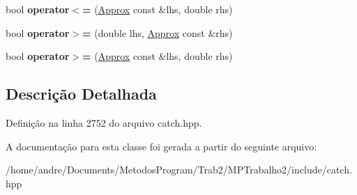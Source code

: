 \begin{DoxyCompactItemize}
\item 
bool {\bfseries operator$<$=} (\hyperlink{classCatch_1_1Detail_1_1Approx}{Approx} const \&lhs, double rhs)\hypertarget{classCatch_1_1Detail_1_1Approx_a75c9382b61421ffab3559c3506182d8f}{}\label{classCatch_1_1Detail_1_1Approx_a75c9382b61421ffab3559c3506182d8f}

\item 
bool {\bfseries operator$>$=} (double lhs, \hyperlink{classCatch_1_1Detail_1_1Approx}{Approx} const \&rhs)\hypertarget{classCatch_1_1Detail_1_1Approx_a4e60095c615a0e6bdd6e8663cd24090b}{}\label{classCatch_1_1Detail_1_1Approx_a4e60095c615a0e6bdd6e8663cd24090b}

\item 
bool {\bfseries operator$>$=} (\hyperlink{classCatch_1_1Detail_1_1Approx}{Approx} const \&lhs, double rhs)\hypertarget{classCatch_1_1Detail_1_1Approx_adaba11ee9aabb4d51d4855f09aa7f7df}{}\label{classCatch_1_1Detail_1_1Approx_adaba11ee9aabb4d51d4855f09aa7f7df}

\end{DoxyCompactItemize}


\subsection{Descrição Detalhada}


Definição na linha 2752 do arquivo catch.\+hpp.



A documentação para esta classe foi gerada a partir do seguinte arquivo\+:\begin{DoxyCompactItemize}
\item 
/home/andre/\+Documents/\+Metodos\+Program/\+Trab2/\+M\+P\+Trabalho2/include/catch.\+hpp\end{DoxyCompactItemize}
